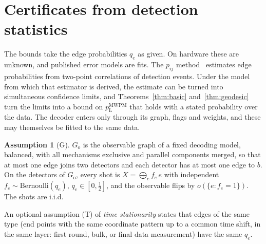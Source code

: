 \documentclass[11pt]{article}
\theoremstyle{plain}
\theoremstyle{definition}
\newtheorem{assumption}{Assumption}
\theoremstyle{remark}
\newcommand{\pM}{p_{\mathrm{L}}^{\mathrm{MWPM}}}
\newcommand{\Go}{G_{\mathrm{o}}}
\renewcommand{\_}{\oldunderscore\allowbreak}
\begin{document}
\section{Certificates from detection statistics}\label{sec:data}

The bounds take the edge probabilities $q_e$ as given. On hardware these are unknown, and published error models are fits. The $p_{ij}$ method~\cite{Google21} estimates edge probabilities from two-point correlations of detection events. Under the model from which that estimator is derived, the estimate can be turned into simultaneous confidence limits, and Theorems~\ref{thm:basic} and~\ref{thm:geodesic} turn the limits into a bound on $\pM$ that holds with a stated probability over the data. The decoder enters only through its graph, flags and weights, and these may themselves be fitted to the same data.

\begin{assumption}[G]\label{ass:G}
$\Go$ is the observable graph of a fixed decoding model, balanced, with all mechanisms exclusive and parallel components merged, so that at most one edge joins two detectors and each detector has at most one edge to $b$. On the detectors of $\Go$, every shot is $X=\bigoplus_ef_e\,e$ with independent $f_e\sim\mathrm{Bernoulli}(q_e)$, $q_e\in[0,\tfrac12]$, and the observable flips by $o(\{e:f_e=1\})$. The shots are i.i.d.
\end{assumption}

\noindent An optional assumption (T) of \emph{time stationarity} states that edges of the same type (end points with the same coordinate pattern up to a common time shift, in the same layer: first round, bulk, or final data measurement) have the same $q_e$.
\end{document}
